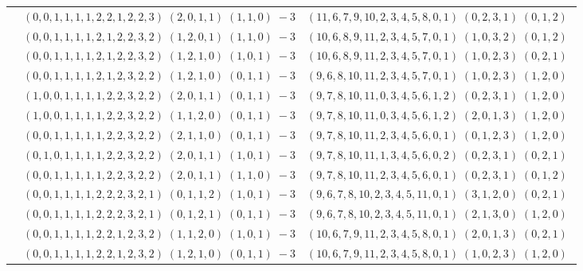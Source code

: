 \documentclass[11pt]{article}
\begin{document}
\begin{longtable}[l]{|c|c|c|}
 \cline{2-3} 
 & $(0 ,0 ,1 ,1 ,1 ,1 ,2 ,2 ,1 ,2 ,2 ,3) \;(2 ,0 ,1 ,1) \;(1 ,1 ,0) \;-3$ & $(11 ,6 ,7 ,9 ,10 ,2 ,3 ,4 ,5 ,8 ,0 ,1) \;(0 ,2 ,3 ,1) \;(0 ,1 ,2) \;$\\ 
 \cline{2-3} 
 & $(0 ,0 ,1 ,1 ,1 ,1 ,2 ,1 ,2 ,2 ,3 ,2) \;(1 ,2 ,0 ,1) \;(1 ,1 ,0) \;-3$ & $(10 ,6 ,8 ,9 ,11 ,2 ,3 ,4 ,5 ,7 ,0 ,1) \;(1 ,0 ,3 ,2) \;(0 ,1 ,2) \;$\\ 
 \cline{2-3} 
 & $(0 ,0 ,1 ,1 ,1 ,1 ,2 ,1 ,2 ,2 ,3 ,2) \;(1 ,2 ,1 ,0) \;(1 ,0 ,1) \;-3$ & $(10 ,6 ,8 ,9 ,11 ,2 ,3 ,4 ,5 ,7 ,0 ,1) \;(1 ,0 ,2 ,3) \;(0 ,2 ,1) \;$\\ 
 \cline{2-3} 
 & $(0 ,0 ,1 ,1 ,1 ,1 ,2 ,1 ,2 ,3 ,2 ,2) \;(1 ,2 ,1 ,0) \;(0 ,1 ,1) \;-3$ & $(9 ,6 ,8 ,10 ,11 ,2 ,3 ,4 ,5 ,7 ,0 ,1) \;(1 ,0 ,2 ,3) \;(1 ,2 ,0) \;$\\ 
 \cline{2-3} 
 & $(1 ,0 ,0 ,1 ,1 ,1 ,1 ,2 ,2 ,3 ,2 ,2) \;(2 ,0 ,1 ,1) \;(0 ,1 ,1) \;-3$ & $(9 ,7 ,8 ,10 ,11 ,0 ,3 ,4 ,5 ,6 ,1 ,2) \;(0 ,2 ,3 ,1) \;(1 ,2 ,0) \;$\\ 
 \cline{2-3} 
 & $(1 ,0 ,0 ,1 ,1 ,1 ,1 ,2 ,2 ,3 ,2 ,2) \;(1 ,1 ,2 ,0) \;(0 ,1 ,1) \;-3$ & $(9 ,7 ,8 ,10 ,11 ,0 ,3 ,4 ,5 ,6 ,1 ,2) \;(2 ,0 ,1 ,3) \;(1 ,2 ,0) \;$\\ 
 \cline{2-3} 
 & $(0 ,0 ,1 ,1 ,1 ,1 ,1 ,2 ,2 ,3 ,2 ,2) \;(2 ,1 ,1 ,0) \;(0 ,1 ,1) \;-3$ & $(9 ,7 ,8 ,10 ,11 ,2 ,3 ,4 ,5 ,6 ,0 ,1) \;(0 ,1 ,2 ,3) \;(1 ,2 ,0) \;$\\ 
 \cline{2-3} 
 & $(0 ,1 ,0 ,1 ,1 ,1 ,1 ,2 ,2 ,3 ,2 ,2) \;(2 ,0 ,1 ,1) \;(1 ,0 ,1) \;-3$ & $(9 ,7 ,8 ,10 ,11 ,1 ,3 ,4 ,5 ,6 ,0 ,2) \;(0 ,2 ,3 ,1) \;(0 ,2 ,1) \;$\\ 
 \cline{2-3} 
 & $(0 ,0 ,1 ,1 ,1 ,1 ,1 ,2 ,2 ,3 ,2 ,2) \;(2 ,0 ,1 ,1) \;(1 ,1 ,0) \;-3$ & $(9 ,7 ,8 ,10 ,11 ,2 ,3 ,4 ,5 ,6 ,0 ,1) \;(0 ,2 ,3 ,1) \;(0 ,1 ,2) \;$\\ 
 \cline{2-3} 
 & $(0 ,0 ,1 ,1 ,1 ,1 ,2 ,2 ,2 ,3 ,2 ,1) \;(0 ,1 ,1 ,2) \;(1 ,0 ,1) \;-3$ & $(9 ,6 ,7 ,8 ,10 ,2 ,3 ,4 ,5 ,11 ,0 ,1) \;(3 ,1 ,2 ,0) \;(0 ,2 ,1) \;$\\ 
 \cline{2-3} 
 & $(0 ,0 ,1 ,1 ,1 ,1 ,2 ,2 ,2 ,3 ,2 ,1) \;(0 ,1 ,2 ,1) \;(0 ,1 ,1) \;-3$ & $(9 ,6 ,7 ,8 ,10 ,2 ,3 ,4 ,5 ,11 ,0 ,1) \;(2 ,1 ,3 ,0) \;(1 ,2 ,0) \;$\\ 
 \cline{2-3} 
 & $(0 ,0 ,1 ,1 ,1 ,1 ,2 ,2 ,1 ,2 ,3 ,2) \;(1 ,1 ,2 ,0) \;(1 ,0 ,1) \;-3$ & $(10 ,6 ,7 ,9 ,11 ,2 ,3 ,4 ,5 ,8 ,0 ,1) \;(2 ,0 ,1 ,3) \;(0 ,2 ,1) \;$\\ 
 \cline{2-3} 
 & $(0 ,0 ,1 ,1 ,1 ,1 ,2 ,2 ,1 ,2 ,3 ,2) \;(1 ,2 ,1 ,0) \;(0 ,1 ,1) \;-3$ & $(10 ,6 ,7 ,9 ,11 ,2 ,3 ,4 ,5 ,8 ,0 ,1) \;(1 ,0 ,2 ,3) \;(1 ,2 ,0) \;$\\ 

\end{longtable}
\end{document}
